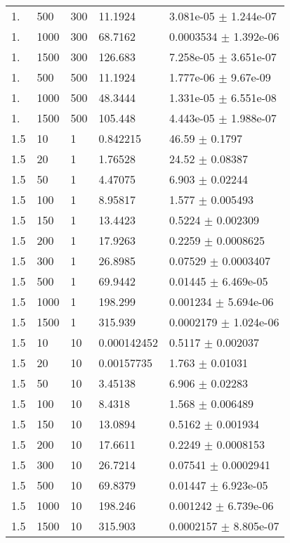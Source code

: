 \begin{longtable}{lllll}
  1. &   500 &   300 &  11.1924 & 3.081e-05 $\pm$ 1.244e-07 \\
  1. &  1000 &   300 &  68.7162 & 0.0003534 $\pm$ 1.392e-06 \\
  1. &  1500 &   300 &  126.683 & 7.258e-05 $\pm$ 3.651e-07 \\
  1. &   500 &   500 &  11.1924 & 1.777e-06 $\pm$ 9.67e-09 \\
  1. &  1000 &   500 &  48.3444 & 1.331e-05 $\pm$ 6.551e-08 \\
  1. &  1500 &   500 &  105.448 & 4.443e-05 $\pm$ 1.988e-07 \\
 1.5 &    10 &     1 & 0.842215 &    46.59 $\pm$   0.1797 \\
 1.5 &    20 &     1 &  1.76528 &    24.52 $\pm$  0.08387 \\
 1.5 &    50 &     1 &  4.47075 &    6.903 $\pm$  0.02244 \\
 1.5 &   100 &     1 &  8.95817 &    1.577 $\pm$ 0.005493 \\
 1.5 &   150 &     1 &  13.4423 &   0.5224 $\pm$ 0.002309 \\
 1.5 &   200 &     1 &  17.9263 &   0.2259 $\pm$ 0.0008625 \\
 1.5 &   300 &     1 &  26.8985 &  0.07529 $\pm$ 0.0003407 \\
 1.5 &   500 &     1 &  69.9442 &  0.01445 $\pm$ 6.469e-05 \\
 1.5 &  1000 &     1 &  198.299 & 0.001234 $\pm$ 5.694e-06 \\
 1.5 &  1500 &     1 &  315.939 & 0.0002179 $\pm$ 1.024e-06 \\
 1.5 &    10 &    10 & 0.000142452 &   0.5117 $\pm$ 0.002037 \\
 1.5 &    20 &    10 & 0.00157735 &    1.763 $\pm$  0.01031 \\
 1.5 &    50 &    10 &  3.45138 &    6.906 $\pm$  0.02283 \\
 1.5 &   100 &    10 &   8.4318 &    1.568 $\pm$ 0.006489 \\
 1.5 &   150 &    10 &  13.0894 &   0.5162 $\pm$ 0.001934 \\
 1.5 &   200 &    10 &  17.6611 &   0.2249 $\pm$ 0.0008153 \\
 1.5 &   300 &    10 &  26.7214 &  0.07541 $\pm$ 0.0002941 \\
 1.5 &   500 &    10 &  69.8379 &  0.01447 $\pm$ 6.923e-05 \\
 1.5 &  1000 &    10 &  198.246 & 0.001242 $\pm$ 6.739e-06 \\
 1.5 &  1500 &    10 &  315.903 & 0.0002157 $\pm$ 8.805e-07 \\

\end{longtable}
